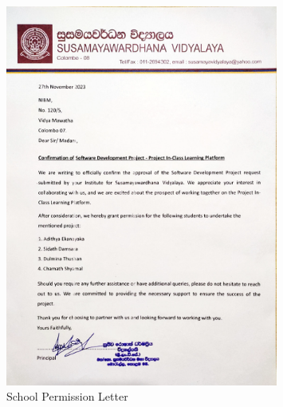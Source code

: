 \documentclass[12pt,a4paper]{report}
\begin{document}
\begin{figure}[htbp]
    \centering
    \includegraphics[width=0.8\textwidth]{school-permission-lettter.png}
    \caption{School Permission Letter}
    \label{fig:permission-letter}
\end{figure}

\end{document}
